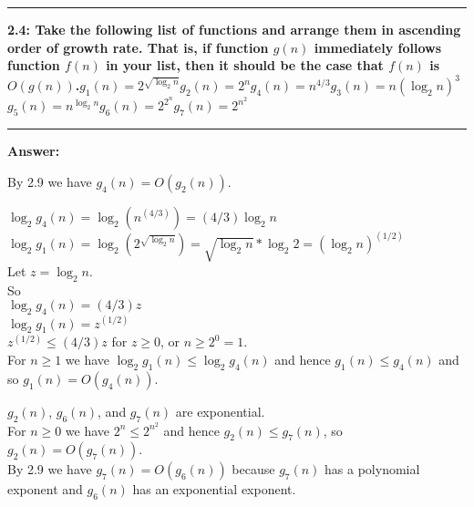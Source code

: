 \documentclass[11pt]{article}
\newcommand\question[2]{\vspace{.25in}\hrule\textbf{#1: #2}\vspace{.5em}\hrule\vspace{.10in}}
\newcommand\answer{\vspace{.10in}\textbf{Answer: }}
\begin{document}
\raggedright
\newcommand\NAME{Stewart Dulaney}  %
\newcommand\SID{904-064-791}     %
\newcommand\HWNUM{1}              %

\question{2.4}{Take the following list of functions and arrange them in ascending order of growth rate. That is, if function $g(n)$ immediately follows function $f(n)$ in your list, then it should be the case that $f(n)$ is $O(g(n))$.\newline\newline$g_1(n) = 2^{\sqrt{\log_2 n}}$\newline$g_2(n) = 2^n$\newline$g_4(n) = n^{4/3}$\newline$g_3(n) = n(\log_2 n)^3$\newline$g_5(n) = n^{\log_2 n}$\newline$g_6(n) = 2^{2^n}$\newline$g_7(n) = 2^{n^2}$}

\answer

By 2.9 we have $g_4(n) = O(g_2(n))$.\newline

$\log_{2}g_4(n) = \log_{2}(n^{(4/3)}) = (4/3)\log_{2}n$\\
$\log_{2}g_1(n) = \log_{2}(2^{\sqrt{\log_{2}n}}) = \sqrt{\log_{2}n} * \log_{2}2 = (\log_{2}n)^{(1/2)}$\\
Let $z = \log_{2}n$.\\
So\\
$\log_{2}g_4(n) = (4/3)z$\\
$\log_{2}g_1(n) = z^{(1/2)}$\\
$z^{(1/2)} \leq (4/3)z$ for $z \geq 0$, or $n \geq 2^0 = 1$.\\
For $n \geq 1$ we have $\log_{2}g_1(n) \leq \log_{2}g_4(n)$ and hence $g_1(n) \leq g_4(n)$ and so $g_1(n) = O(g_4(n))$.\newline

$g_2(n)$, $g_6(n)$, and $g_7(n)$ are exponential.\\ 
For $n \geq 0$ we have $2^n \leq 2^{n^2}$ and hence $g_2(n) \leq g_7(n)$, so $g_2(n) = O(g_7(n))$.\\
By 2.9 we have $g_7(n) = O(g_6(n))$ because $g_7(n)$ has a polynomial exponent and $g_6(n)$  has an exponential exponent.\newline
\end{document}
